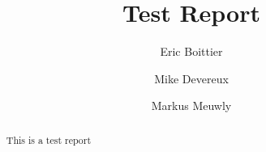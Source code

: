 \documentclass[journal=jacsat,manuscript=article]{achemso}
\author{Eric Boittier}
\author{Mike Devereux}
\author{Markus Meuwly}
\affiliation[University of Basel]
{Department of Chemistry, University of Basel, Switzerland}
\title[ Test Report ] { Test Report }
\begin{document}
\begin{abstract}
This is a test report
\end{abstract}
\end{document}
